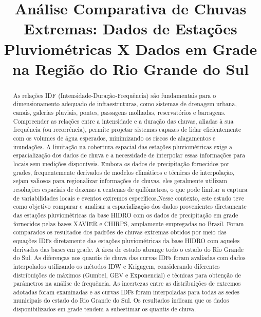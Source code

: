\documentclass[
]{agujournal2019}
\begin{document}
\title{Análise Comparativa de Chuvas Extremas: Dados de Estações
Pluviométricas X Dados em Grade na Região do Rio Grande do Sul}



\begin{abstract}
As relações IDF (Intensidade-Duração-Frequência) são fundamentais para o
dimensionamento adequado de infraestruturas, como sistemas de drenagem
urbana, canais, galerias pluviais, pontes, passagens molhadas,
reservatórios e barragens. Compreender as relações entre a intensidade e
a duração das chuvas, aliadas à sua frequência (ou recorrência), permite
projetar sistemas capazes de lidar eficientemente com os volumes de água
esperados, minimizando os riscos de alagamentos e inundações. A
limitação na cobertura espacial das estações pluviométricas exige a
espacialização dos dados de chuva e a necessidade de interpolar essas
informações para locais sem medições disponíveis. Embora os dados de
precipitação fornecidos por grades, frequentemente derivados de modelos
climáticos e técnicas de interpolação, sejam valiosos para regionalizar
informações de chuvas, eles geralmente utilizam resoluções espaciais de
dezenas a centenas de quilômetros, o que pode limitar a captura de
variabilidades locais e eventos extremos específicos.Nesse contexto,
este estudo teve como objetivo comparar e analisar a espacialização dos
dados provenientes diretamente das estações pluviométricas da base HIDRO
com os dados de precipitação em grade fornecidos pelas bases XAVIER e
CHIRPS, amplamente empregadas no Brasil. Foram comparados os resultados
dos padrões de chuvas extremas obtidos por meio das equações IDFs
diretamente das estações pluviométricas da base HIDRO com aqueles
derivados das bases em grade. A área de estudo abrange todo o estado do
Rio Grande do Sul. As diferenças nos quantis de chuva das curvas IDFs
foram avaliadas com dados interpolados utilizando os métodos IDW e
Krigagem, considerando diferentes distribuições de máximos (Gumbel, GEV
e Exponencial) e técnicas para obtenção de parâmetros na análise de
frequência. As incertezas entre as distribuições de extremos adotadas
foram examinadas e as curvas IDFs foram interpoladas para todas as sedes
municipais do estado do Rio Grande do Sul. Os resultados indicam que os
dados disponibilizados em grade tendem a subestimar os quantis de chuva.
\end{abstract}
\end{document}
